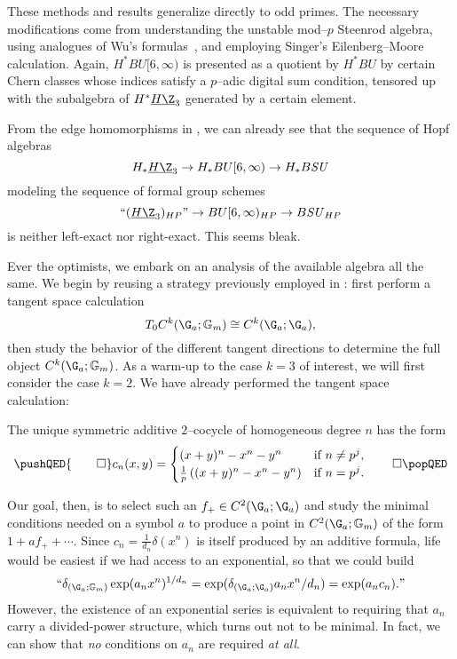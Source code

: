 \begin{remark}
These methods and results generalize directly to odd primes.  The necessary modifications come from understanding the unstable mod--$p$ Steenrod algebra, using analogues of Wu's formulas~\cite{Shay}, and employing Singer's Eilenberg--Moore calculation.  Again, $H^* BU[6, \infty)$ is presented as a quotient by $H^* BU$ by certain Chern classes whose indices satisfy a $p$--adic digital sum condition, tensored up with the subalgebra of $H^* \OS{H\Z}{3}$ generated by a certain element.
\end{remark}

From the edge homomorphisms in , we can already see that the sequence of Hopf algebras \[H_* \OS{H\Z}{3} \to H_* BU[6, \infty) \to H_* B\SU\] modeling the sequence of formal group schemes \[\text{``$(\OS{H\Z}{3})_{HP}$''} \to BU[6, \infty)_{HP} \to B\SU_{HP}\] is neither left-exact nor right-exact.  This seems bleak.

Ever the optimists, we embark on an analysis of the available algebra all the same.  We begin by reusing a strategy previously employed in : first perform a tangent space calculation \[T_0 C^k(\G_a; \Gm) \cong C^k(\G_a; \G_a),\] then study the behavior of the different tangent directions to determine the full object $C^k(\G_a; \Gm)$.  As a warm-up to the case $k = 3$ of interest, we will first consider the case $k = 2$.  We have already performed the tangent space calculation:

\begin{corollary}
The unique symmetric additive $2$--cocycle of homogeneous degree $n$ has the form
\[\pushQED{\qed}
c_n(x, y) = \begin{cases} (x + y)^n - x^n - y^n & \text{if $n \ne p^j$}, \\ \frac{1}{p} \left( (x + y)^n - x^n - y^n \right) & \text{if $n = p^j$}. \end{cases} \qedhere
\popQED\]
\end{corollary}

Our goal, then, is to select such an $f_+ \in C^2(\G_a; \G_a)$ and study the minimal conditions needed on a symbol $a$ to produce a point in $C^2(\G_a; \Gm)$ of the form $1 + af_+ + \cdots$.  Since $c_n = \frac{1}{d_n} \delta(x^n)$ is itself produced by an additive formula, life would be easiest if we had access to an exponential, so that we could build \[\text{``$ \delta_{(\G_a; \Gm)} \exp(a_n x^n)^{1/d_n} = \exp(\delta_{(\G_a; \G_a)} a_n x^n / d_n) = \exp(a_n c_n). $''}\]  However, the existence of an exponential series is equivalent to requiring that $a_n$ carry a divided-power structure, which turns out not to be minimal.  In fact, we can show that \emph{no} conditions on $a_n$ are required \emph{at all}.

